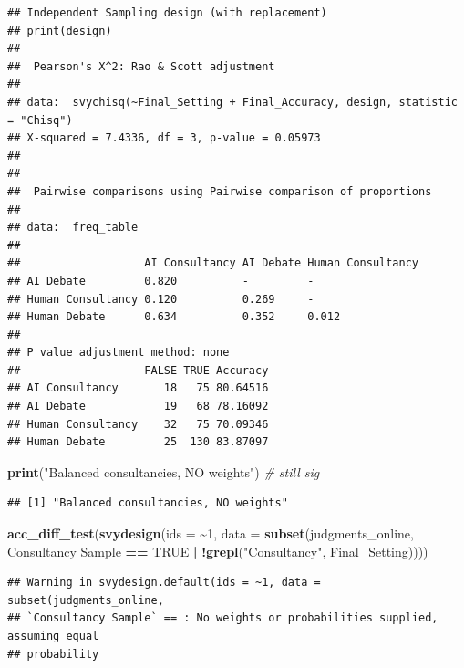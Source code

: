 \documentclass[
]{article}
\newenvironment{Shaded}{\begin{snugshade}}{\end{snugshade}}
\newcommand{\AttributeTok}[1]{\textcolor[rgb]{0.13,0.29,0.53}{#1}}
\newcommand{\CommentTok}[1]{\textcolor[rgb]{0.56,0.35,0.01}{\textit{#1}}}
\newcommand{\ConstantTok}[1]{\textcolor[rgb]{0.56,0.35,0.01}{#1}}
\newcommand{\DecValTok}[1]{\textcolor[rgb]{0.00,0.00,0.81}{#1}}
\newcommand{\FunctionTok}[1]{\textcolor[rgb]{0.13,0.29,0.53}{\textbf{#1}}}
\newcommand{\NormalTok}[1]{#1}
\newcommand{\SpecialCharTok}[1]{\textcolor[rgb]{0.81,0.36,0.00}{\textbf{#1}}}
\newcommand{\StringTok}[1]{\textcolor[rgb]{0.31,0.60,0.02}{#1}}
\begin{document}
\begin{verbatim}
## Independent Sampling design (with replacement)
## print(design)
## 
##  Pearson's X^2: Rao & Scott adjustment
## 
## data:  svychisq(~Final_Setting + Final_Accuracy, design, statistic = "Chisq")
## X-squared = 7.4336, df = 3, p-value = 0.05973
## 
## 
##  Pairwise comparisons using Pairwise comparison of proportions 
## 
## data:  freq_table 
## 
##                   AI Consultancy AI Debate Human Consultancy
## AI Debate         0.820          -         -                
## Human Consultancy 0.120          0.269     -                
## Human Debate      0.634          0.352     0.012            
## 
## P value adjustment method: none 
##                   FALSE TRUE Accuracy
## AI Consultancy       18   75 80.64516
## AI Debate            19   68 78.16092
## Human Consultancy    32   75 70.09346
## Human Debate         25  130 83.87097
\end{verbatim}

\begin{Shaded}
\begin{Highlighting}[]
\FunctionTok{print}\NormalTok{(}\StringTok{"Balanced consultancies, NO weights"}\NormalTok{) }\CommentTok{\# still sig}
\end{Highlighting}
\end{Shaded}

\begin{verbatim}
## [1] "Balanced consultancies, NO weights"
\end{verbatim}

\begin{Shaded}
\begin{Highlighting}[]
\FunctionTok{acc\_diff\_test}\NormalTok{(}\FunctionTok{svydesign}\NormalTok{(}\AttributeTok{ids =} \SpecialCharTok{\textasciitilde{}}\DecValTok{1}\NormalTok{, }\AttributeTok{data =} \FunctionTok{subset}\NormalTok{(judgments\_online, }\StringTok{\textasciigrave{}}\AttributeTok{Consultancy Sample}\StringTok{\textasciigrave{}} \SpecialCharTok{==} \ConstantTok{TRUE} \SpecialCharTok{|} \SpecialCharTok{!}\FunctionTok{grepl}\NormalTok{(}\StringTok{"Consultancy"}\NormalTok{, Final\_Setting))))}
\end{Highlighting}
\end{Shaded}

\begin{verbatim}
## Warning in svydesign.default(ids = ~1, data = subset(judgments_online,
## `Consultancy Sample` == : No weights or probabilities supplied, assuming equal
## probability
\end{verbatim}
\end{document}
